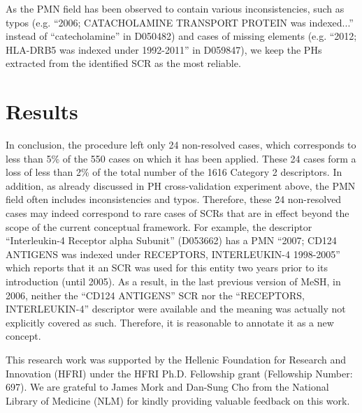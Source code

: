 As the PMN field has been observed to contain various inconsistencies, such as typos (e.g. ``2006; CATACHOLAMINE TRANSPORT PROTEIN was indexed...'' instead of ``catecholamine'' in D050482) and cases of missing elements (e.g. ``2012; HLA-DRB5 was indexed under 1992-2011'' in D059847), we keep the PHs extracted from the identified SCR as the most reliable. 

\section{Results}

In conclusion, the procedure left only 24 non-resolved cases, which corresponds to less than 5\% of the 550 cases on which it has been applied. These 24 cases form a loss of less than 2\% of the total number of the 1616 Category 2 descriptors. In addition, as already discussed in PH cross-validation experiment above, the PMN field often includes inconsistencies and typos. Therefore, these 24 non-resolved cases may indeed correspond to rare cases of SCRs that are in effect beyond the scope of the current conceptual framework. For example, the descriptor ``Interleukin-4 Receptor alpha Subunit'' (D053662) has a PMN ``2007; CD124 ANTIGENS was indexed under RECEPTORS, INTERLEUKIN-4 1998-2005'' which reports that it an SCR was used for this entity two years prior to its introduction (until 2005). As a result, in the last previous version of MeSH, in 2006, neither the ``CD124 ANTIGENS'' SCR nor the ``RECEPTORS, INTERLEUKIN-4'' descriptor were available and the meaning was actually not explicitly covered as such. Therefore, it is reasonable to annotate it as a new concept. 




\begin{acknowledgements}
This research work was supported by the Hellenic Foundation for Research and Innovation (HFRI) under the HFRI Ph.D. Fellowship grant (Fellowship Number: 697).
We are grateful to James Mork and Dan-Sung Cho from the National Library of Medicine (NLM) for kindly providing valuable feedback on this work.
\end{acknowledgements}


%
%


